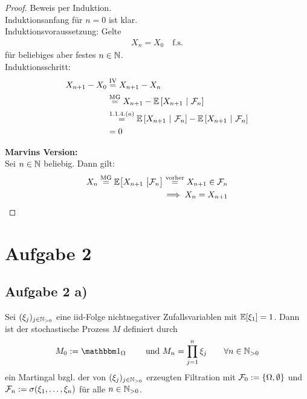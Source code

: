 \documentclass[12pt,a4paper]{article}
\begin{document}
\begin{proof}
	Beweis per Induktion.\\
	Induktionsanfang für $n=0$ ist klar.\\
	Induktionsvoraussetzung: Gelte
	\begin{align*}
		X_n = X_0 \quad \text{f.s.}
	\end{align*}
	für beliebiges aber festes $n\in\mathbb{N}$.\\
	Induktionsschritt:
	\begin{align*}
		X_{n+1}-X_0
		&\stackrel{\text{IV}}{=} X_{n+1} - X_{n} \\
		&\stackrel{\text{MG}}{=} X_{n+1} - \mathbb{E}\left[{X_{n+1}}~|~{\mathcal{F}_{n}}\right] \\
		&\stackrel{1.1.4.(a)}{=} \mathbb{E}\left[{X_{n+1}}~|~{\mathcal{F}_{n}}\right] - \mathbb{E}\left[{X_{n+1}}~|~{\mathcal{F}_{n}}\right] \\
		&= 0
	\end{align*}
	
	\textbf{Marvins Version:}\\
	Sei $n\in\mathbb{N}$ beliebig. Dann gilt:
	\begin{align*}
		X_n\stackrel{\text{MG}}{=} \mathbb{E}\big[X_{n+1}~\big|\mathcal{F}_n\big]\stackrel{\text{vorher}}{=} X_{n+1}\in\mathcal{F}_n\\
	\implies X_n=X_{n+1}
	\end{align*}
\end{proof}

\section*{Aufgabe 2}
\subsection*{Aufgabe 2 a)}
Sei $(\xi_j)_{j\in\mathbb{N}_{>0}}$ eine iid-Folge nichtnegativer Zufallsvariablen mit $\mathbb{E}[\xi_1]=1$. Dann ist der stochastische Prozess $M$ definiert durch
\begin{align*}
M_0:=\indi_\Omega\qquad\text{ und }M_n=\prod\limits_{j=1}^n\xi_j\qquad\forall n\in\N_{>0}
\end{align*}
ein Martingal bzgl. der von $(\xi_j)_{j\in\mathbb{N}_{>0}}$ erzeugten Filtration  mit $\mathcal{F}_0:=\lbrace \Omega,\emptyset\rbrace$ und $\mathcal{F}_n:=\sigma(\xi_1,\ldots,\xi_n)$ für alle $n\in\mathbb{N}_{>0}$.
\end{document}
